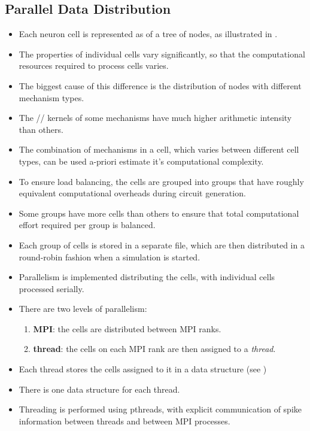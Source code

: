 \subsection{Parallel Data Distribution}
\begin{itemize}
\item
    Each neuron cell is represented as of a tree of nodes, as illustrated in .
\item
    The properties of individual cells vary significantly, so that the computational resources required to process cells varies.
\item
    The biggest cause of this difference is the distribution of nodes with different mechanism types.
\item
    The // kernels of some mechanisms have much higher arithmetic intensity than others.
\item
    The combination of mechanisms in a cell, which varies between different cell types, can be used a-priori estimate it's computational complexity.
\end{itemize}

\begin{itemize}
\item
    To ensure load balancing, the cells are grouped into groups that have roughly equivalent computational overheads during circuit generation.
\item
    Some groups have more cells than others to ensure that total computational effort required per group is balanced.
\item
    Each group of cells is stored in a separate  file, which are then distributed in a round-robin fashion when a \neuron simulation is started.
\end{itemize}

\begin{itemize}
\item
    Parallelism is implemented distributing the cells, with individual cells processed serially.
\item
    There are two levels of parallelism:
    \begin{enumerate}
    \item
        \textbf{MPI}: the cells are distributed between MPI ranks.
    \item
        \textbf{thread}: the cells on each MPI rank are then assigned to a \emph{thread}.
    \end{enumerate}
\item
    Each thread stores the cells assigned to it in a  data structure (see )
\item
    There is one  data structure for each thread.
\item
    Threading is performed using pthreads, with explicit communication of spike information between threads and between MPI processes.
\end{itemize}

